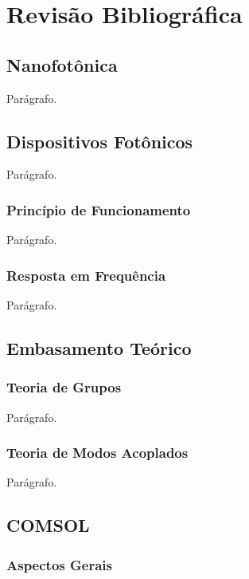 \chapter{Revisão Bibliográfica}      \label{Revisao Bibliografica}



\section{Nanofotônica}

Parágrafo.

\section{Dispositivos Fotônicos}

Parágrafo.

\subsection{Princípio de Funcionamento}

Parágrafo.

\subsection{Resposta em Frequência}

Parágrafo.


\section{Embasamento Teórico}      \label{Embasamento Teorico}

\subsection{Teoria de Grupos}

Parágrafo.


\subsection{Teoria de Modos Acoplados}

Parágrafo.


\section{COMSOL}

\subsection{Aspectos Gerais}


